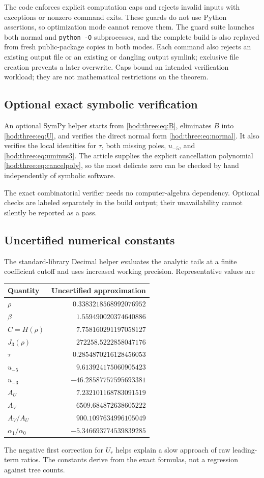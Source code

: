 \documentclass[11pt,letterpaper]{article}
\theoremstyle{definition}\newtheorem{definition}[theorem]{Definition}
\theoremstyle{remark}\newtheorem{remark}[theorem]{Remark}
\begin{document}
The code enforces explicit computation caps and rejects invalid inputs with exceptions or nonzero command exits. These guards do not use Python assertions, so optimization mode cannot remove them. The guard suite launches both normal and \texttt{python -O} subprocesses, and the complete build is also replayed from fresh public-package copies in both modes. Each command also rejects an existing output file or an existing or dangling output symlink; exclusive file creation prevents a later overwrite. Caps bound an intended verification workload; they are not mathematical restrictions on the theorem.

\subsection{Optional exact symbolic verification}
An optional SymPy helper starts from \eqref{hod:three:eq:B}, eliminates $B$ into \eqref{hod:three:eq:U}, and verifies the direct normal form \eqref{hod:three:eq:normal}. It also verifies the local identities for $\tau$, both missing poles, $u_{-5}$, and \eqref{hod:three:eq:uminus3}. The article supplies the explicit cancellation polynomial \eqref{hod:three:eq:cancelpoly}, so the most delicate zero can be checked by hand independently of symbolic software.

The exact combinatorial verifier needs no computer-algebra dependency. Optional checks are labeled separately in the build output; their unavailability cannot silently be reported as a pass.

\subsection{Uncertified numerical constants}
The standard-library Decimal helper evaluates the analytic tails at a finite coefficient cutoff and uses increased working precision. Representative values are
\begin{center}
\begin{tabular}{lr}
\toprule
Quantity & Uncertified approximation\\
\midrule
$\rho$ & $0.3383218568992076952$\\
$\beta$ & $1.559490020374640886$\\
$C=H(\rho)$ & $7.758160291197058127$\\
$J_3(\rho)$ & $272258.5222858047176$\\
$\tau$ & $0.2854870216128456053$\\
$u_{-5}$ & $9.613924175060905423$\\
$u_{-3}$ & $-46.28587757595693381$\\
$A_U$ & $7.232101168783091519$\\
$A_V$ & $6509.684872638605222$\\
$A_V/A_U$ & $900.1097634996105049$\\
$\alpha_1/\alpha_0$ & $-5.346693774539839285$\\
\bottomrule
\end{tabular}
\end{center}
The negative first correction for $U_r$ helps explain a slow approach of raw leading-term ratios. The constants derive from the exact formulas, not a regression against tree counts.
\end{document}
